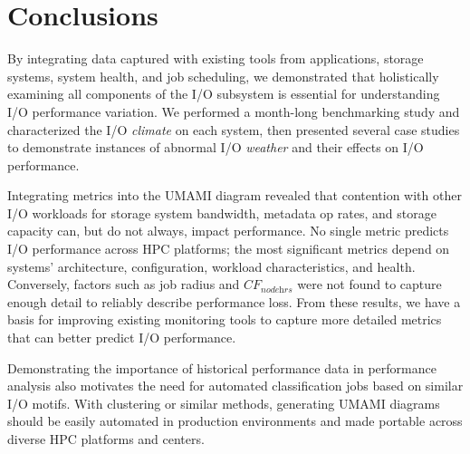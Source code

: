 \section{Conclusions} \label{sec:conclusions}

By integrating data captured with existing tools from applications, storage systems, system health, and job scheduling, we demonstrated that holistically examining all components of the I/O subsystem is essential for understanding I/O performance variation.
We performed a month-long benchmarking study and characterized the I/O \emph{climate} on each system, then presented several case studies to demonstrate instances of abnormal I/O \emph{weather} and their effects on I/O performance.

Integrating metrics into the UMAMI diagram revealed that contention with other I/O workloads for storage system bandwidth, metadata op rates, and storage capacity can, but do not always, impact performance.
No single metric predicts I/O performance across HPC platforms;
the most significant metrics depend on systems' architecture, configuration, workload characteristics, and health.
Conversely, factors such as job radius and $\textit{CF}_{\textit{nodehrs}}$ were not found to capture enough detail to reliably describe performance loss.
From these results, we have a basis for improving existing monitoring tools to capture more detailed metrics that can better predict I/O performance.

Demonstrating the importance of historical performance data in performance analysis also motivates the need for automated classification jobs based on similar I/O motifs.  With  clustering or similar methods, generating UMAMI diagrams should be easily automated in production environments and made portable across diverse HPC platforms and centers.